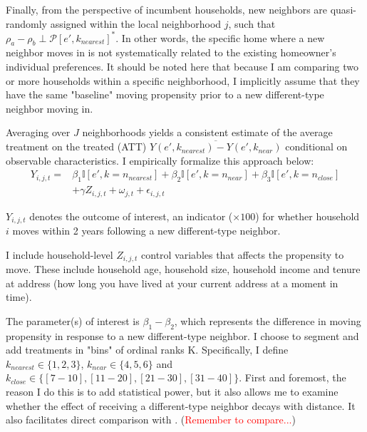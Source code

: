 \documentclass[../main.tex]{subfiles}
\begin{document}
Finally, from the perspective of incumbent households, new neighbors are quasi-randomly assigned within the local neighborhood $j$, such that $\rho_a - \rho_b \perp \mathcal{P}[e', k_{nearest}]^*$. In other words, the specific home where a new neighbor moves in is not systematically related to the existing homeowner's individual preferences. It should be noted here that because I am comparing two or more households within a specific neighborhood, I implicitly assume that they have the same "baseline" moving propensity prior to a new different-type neighbor moving in. 

Averaging over $J$ neighborhoods yields a consistent estimate of the average treatment on the treated (ATT) $\overline{Y(e', k_{nearest}) - Y(e', k_{near})}$ conditional on observable characteristics. I empirically formalize this approach below:
\begin{equation}
\begin{split}
    Y_{i, j, t} = &\beta_1 \mathbb{I}[e', k=n_{nearest}] + \beta_2 \mathbb{I}[e', k = n_{near}] + \beta_3 \mathbb{I}[e', k = n_{close}] \\
    & + \gamma Z_{i, j, t} + \omega_{j, t} + \epsilon_{i, j, t}
\label{eq:main_eq_schelling_behavior}
\end{split}
\end{equation}

$Y_{i, j, t}$ denotes the outcome of interest, an indicator ($\times100$) for whether household $i$ moves within 2 years following a new different-type neighbor. 

I include household-level $Z_{i,j,t}$ control variables that affects the propensity to move. These include household age, household size, household income and tenure at address (how long you have lived at your current address at a moment in time). 

The parameter(s) of interest is $\beta_1 - \beta_2$, which represents the difference in moving propensity in response to a new different-type neighbor. I choose to segment and add treatments in "bins" of ordinal ranks K. Specifically, I define $k_{nearest} \in \{1, 2, 3\}$, $k_{near} \in \{4, 5, 6\}$ and $k_{close} \in \{[7-10], [11-20], [21-30], [31-40]\}$. First and foremost, the reason I do this is to add statistical power, but it also allows me to examine whether the effect of receiving a different-type neighbor decays with distance. It also facilitates direct comparison with \textcite{Bayer_2022_nearest_neighbor}. (\textcolor{red}{Remember to compare...})
\end{document}
